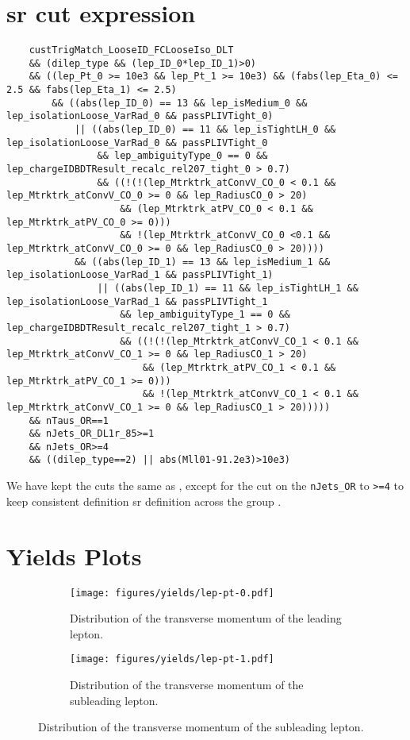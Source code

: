 \section{\gls{sr} cut expression}

 {\scriptsize
  \begin{verbatim}
    custTrigMatch_LooseID_FCLooseIso_DLT
    && (dilep_type && (lep_ID_0*lep_ID_1)>0)
    && ((lep_Pt_0 >= 10e3 && lep_Pt_1 >= 10e3) && (fabs(lep_Eta_0) <= 2.5 && fabs(lep_Eta_1) <= 2.5)
        && ((abs(lep_ID_0) == 13 && lep_isMedium_0 && lep_isolationLoose_VarRad_0 && passPLIVTight_0)
            || ((abs(lep_ID_0) == 11 && lep_isTightLH_0 && lep_isolationLoose_VarRad_0 && passPLIVTight_0
                && lep_ambiguityType_0 == 0 && lep_chargeIDBDTResult_recalc_rel207_tight_0 > 0.7)
                && ((!(!(lep_Mtrktrk_atConvV_CO_0 < 0.1 && lep_Mtrktrk_atConvV_CO_0 >= 0 && lep_RadiusCO_0 > 20)
                    && (lep_Mtrktrk_atPV_CO_0 < 0.1 && lep_Mtrktrk_atPV_CO_0 >= 0)))
                    && !(lep_Mtrktrk_atConvV_CO_0 <0.1 && lep_Mtrktrk_atConvV_CO_0 >= 0 && lep_RadiusCO_0 > 20))))
            && ((abs(lep_ID_1) == 13 && lep_isMedium_1 && lep_isolationLoose_VarRad_1 && passPLIVTight_1)
                || ((abs(lep_ID_1) == 11 && lep_isTightLH_1 && lep_isolationLoose_VarRad_1 && passPLIVTight_1
                    && lep_ambiguityType_1 == 0 && lep_chargeIDBDTResult_recalc_rel207_tight_1 > 0.7)
                    && ((!(!(lep_Mtrktrk_atConvV_CO_1 < 0.1 && lep_Mtrktrk_atConvV_CO_1 >= 0 && lep_RadiusCO_1 > 20)
                        && (lep_Mtrktrk_atPV_CO_1 < 0.1 && lep_Mtrktrk_atPV_CO_1 >= 0)))
                        && !(lep_Mtrktrk_atConvV_CO_1 < 0.1 && lep_Mtrktrk_atConvV_CO_1 >= 0 && lep_RadiusCO_1 > 20)))))
    && nTaus_OR==1
    && nJets_OR_DL1r_85>=1
    && nJets_OR>=4
    && ((dilep_type==2) || abs(Mll01-91.2e3)>10e3)
\end{verbatim}
 }

We have kept the cuts the same as \cite{severin}, except for the cut on the \verb|nJets_OR| to \verb|>=4| to keep
consistent definition \gls{sr} definition across the group .

\section{Yields Plots}
\label{appendix:yields}

\begin{figure}[htb!]
    \centering
    \begin{subfigure}{0.45\textwidth}
        \texttt{[image: figures/yields/lep-pt-0.pdf]}
        \caption{Distribution of the transverse momentum of the leading lepton.}
    \end{subfigure}\hfill%
    \begin{subfigure}{0.45\textwidth}
        \texttt{[image: figures/yields/lep-pt-1.pdf]}
        \caption{Distribution of the transverse momentum of the subleading lepton.}
    \end{subfigure}
\end{figure}

